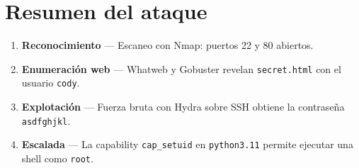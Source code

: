 \documentclass[12pt,a4paper]{article}
\begin{document}
\section{Resumen del ataque}

\begin{enumerate}
  \item \textbf{Reconocimiento} — Escaneo con Nmap: puertos 22 y 80 abiertos.
  \item \textbf{Enumeración web} — Whatweb y Gobuster revelan \texttt{secret.html} con el usuario \texttt{cody}.
  \item \textbf{Explotación} — Fuerza bruta con Hydra sobre SSH obtiene la contraseña \texttt{asdfghjkl}.
  \item \textbf{Escalada} — La capability \texttt{cap\_setuid} en \texttt{python3.11} permite ejecutar una shell como \texttt{root}.
\end{enumerate}
\end{document}
